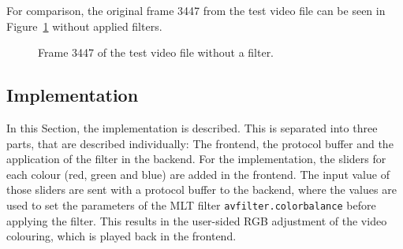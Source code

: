 \documentclass[../MasterThesis.tex]{subfiles}
\begin{document}
For comparison, the original frame 3447 from the test video file can be seen in Figure~\ref{figure:septo_nofilter} without applied filters.

\begin{figure}[H]
	\begin{center}
		\caption[Frame 3447 of the test video file without a filter.]{Frame 3447 of the test video file without a filter.}
		\label{figure:septo_nofilter}
	\end{center}
\end{figure}












\subsection{Implementation} \label{subsection:implementation}

In this Section, the implementation is described. This is separated into three parts, that are described individually: The frontend, the protocol buffer and the application of the filter in the backend. For the implementation, the sliders for each colour (red, green and blue) are added in the frontend. The input value of those sliders are sent with a protocol buffer to the backend, where the values are used to set the parameters of the MLT filter \texttt{avfilter.colorbalance} before applying the filter. This results in the user-sided RGB adjustment of the video colouring, which is played back in the frontend.

\end{document}
